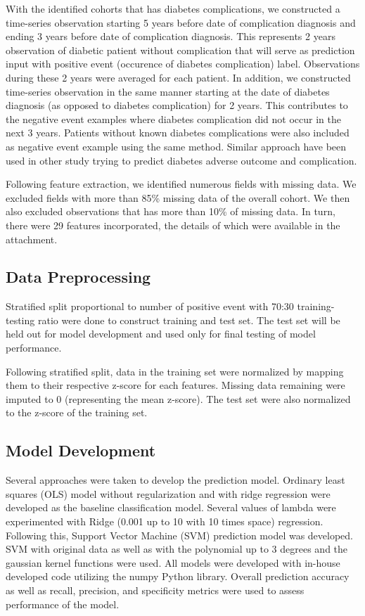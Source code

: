 \documentclass{article}
\begin{document}
With the identified cohorts that has diabetes complications, we constructed a time-series observation starting 5 years before date of complication diagnosis and ending 3 years before date of complication diagnosis. This represents 2 years observation of diabetic patient without complication that will serve as prediction input with positive event (occurence of diabetes complication) label. Observations during these 2 years were averaged for each patient. In addition, we constructed time-series observation in the same manner starting at the date of diabetes diagnosis (as opposed to diabetes complication) for 2 years. This contributes to the negative event examples where diabetes complication did not occur in the next 3 years. Patients without known diabetes complications were also included as negative event example using the same method. Similar approach have been used in other study trying to predict diabetes adverse outcome and complication.\cite{ravaut21}

Following feature extraction, we identified numerous fields with missing data. We excluded fields with more than 85\% missing data of the overall cohort. We then also excluded observations that has more than 10\% of missing data. In turn, there were 29 features incorporated, the details of which were available in the attachment.

\subsection{Data Preprocessing}

Stratified split proportional to number of positive event with 70:30 training-testing ratio were done to construct training and test set. The test set will be held out for model development and used only for final testing of model performance.

Following stratified split, data in the training set were normalized by mapping them to their respective z-score for each features. Missing data remaining were imputed to 0 (representing the mean z-score). The test set were also normalized to the z-score of the training set.

\subsection{Model Development}

Several approaches were taken to develop the prediction model. Ordinary least squares (OLS) model without regularization and with ridge regression were developed as the baseline classification model. Several values of lambda were experimented with Ridge (0.001 up to 10 with 10 times space) regression. Following this, Support Vector Machine (SVM) prediction model was developed. SVM with original data as well as with the polynomial up to 3 degrees and the gaussian kernel functions were used. All models were developed with in-house developed code utilizing the numpy Python library. Overall prediction accuracy as well as recall, precision, and specificity metrics were used to assess performance of the model.
\end{document}
